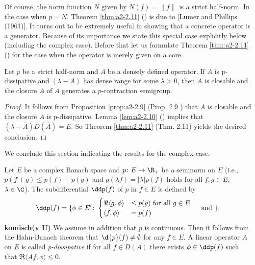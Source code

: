 Of course, the norm function $N$ given by $N(f) = \|f\|$ is a strict half-norm.
In the case when $p = N$, Theorem \ref{thm:a2-2.11} ()  
is due to [Lumer and Phillips (1961)].
It turns out to be extremely useful in showing that a concrete operator is a generator.
Because of its importance we state this special case explicitly below (including the complex case).
Before that let us formulate Theorem \ref{thm:a2-2.11} () 
for the case when the operator is merely given on a core.

\begin{corollary}\label{cor:a2-2.12}
Let $p$ be a strict half-norm and $A$ be a densely defined operator.
If $A$ is p-dissipative and $(\lambda - A)$ has dense range for some $\lambda > 0$, then $A$ is closable and the closure $\overline{A}$ of $A$ generates a $p$-contraction semigroup.
\end{corollary}
\begin{proof}
It follows from Proposition \ref{prop:a2-2.9} (\lnm Prop. 2.9 )
that $A$ is closable and the closure $\overline{A}$ is p-dissipative.
Lemma \ref{lem:a2-2.10} () 
implies that $(\lambda- \overline{A})D(\overline{A}) = E$.
So Theorem \ref{thm:a2-2.11} (\lnm Thm. 2.11) 
yields the desired conclusion.
\end{proof}
We conclude this section indicating the results for the complex case.

Let $E$ be a complex Banach space and $p \colon E \to \R_{+}$ 
be a seminorm on $E$ (i.e., $p(f + g) \leq p(f) + p(g)$ and $p(\lambda f) = |\lambda|p(f)$ holds for all $f, g \in E$, $\lambda \in \C$).
The subdifferential $\ddp(f)$ of $p$ in $f \in E$ is defined by
\begin{equation}\label{eq:a2-4.15}
\ddp(f) = \{\phi \in E' \colon \begin{cases} \Re\langle g,\phi \rangle &\leq p(g) \text{ for all } g \in E \\ \langle f,\phi \rangle &= p(f) \end{cases} \quad \text{ and } \}.
\end{equation}
\textbf{komisch(v U)}
We assume in addition that $p$ is continuous.
Then it follows from the Hahn-Banach theorem that $\d{p}(f) \neq \emptyset$ for any $f \in E$.
A linear operator $A$ on $E$ is called \emph{p-dissipative} if for all $f \in D(A)$ there exists $\phi \in \ddp(f)$ such that $\Re\langle Af,\phi \rangle \leq 0$.

